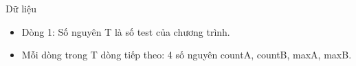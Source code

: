 Dữ liệu
\begin{itemize}
	\item     Dòng 1: Số nguyên T là số test của chương trình.   
	\item     Mỗi dòng trong T dòng tiếp theo: 4 số nguyên countA, countB, maxA, maxB.   
\end{itemize}